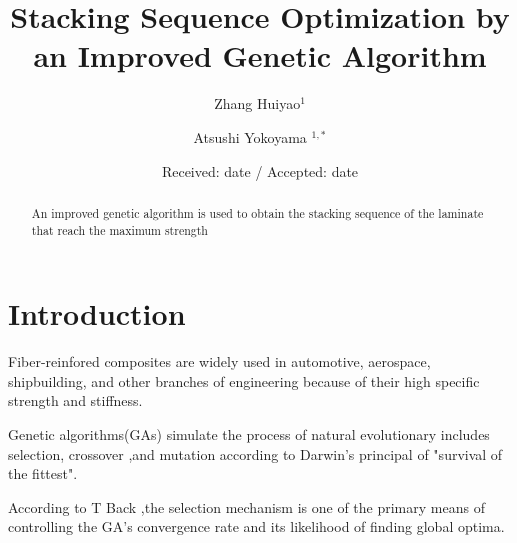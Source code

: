 \documentclass[smallextended]{svjour3}       %
\begin{document}
\title{Stacking Sequence Optimization by an Improved Genetic Algorithm}
\author{Zhang Huiyao$^1$  \and
	Atsushi Yokoyama $^{1,*}$
}
\date{Received: date / Accepted: date}
\maketitle

\begin{abstract}
An improved genetic algorithm is used to obtain the stacking sequence of the laminate that reach the maximum strength


\end{abstract}



\section{Introduction}
Fiber-reinfored composites are widely used in automotive, aerospace, shipbuilding, and other branches of engineering because of their high specific strength and stiffness.


Genetic algorithms(GAs) simulate the process of natural evolutionary includes selection, crossover ,and mutation  according to Darwin's principal of "survival of the fittest".

According to T Back \cite{back1994selective},the selection mechanism is one of the primary means of controlling the GA's convergence rate and its
likelihood of finding global optima.
\end{document}
